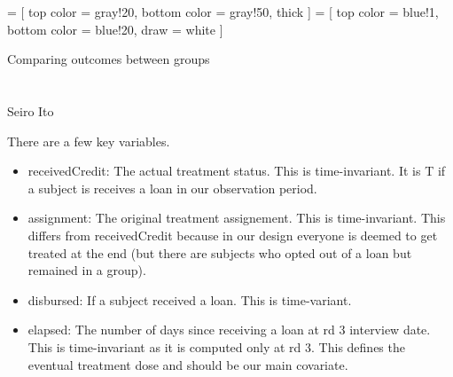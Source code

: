 

\def\pgfsysdriver{pgfsys-dvipdfm.def}
\usepackage{tikz}
\usepackage{fancyhdr}
\usetikzlibrary{calc, arrows, decorations, decorations.pathreplacing, backgrounds}
 =
[
top color = gray!20, bottom color = gray!50, thick
]
 =
[
top color = blue!1, bottom color = blue!20, draw = white
]



\setlength{\baselineskip}{12pt}





\hfil Comparing outcomes between groups\\

\hfil\MonthDY\\
\hfil{\footnotesize\currenttime}\\

\hfil Seiro Ito

\tableofcontents

\setlength{\parindent}{1em}

\vspace{2ex}

There are a few key variables.
\begin{itemize}
\vspace{1.0ex}\setlength{\itemsep}{1.0ex}\setlength{\baselineskip}{12pt}
\item	\textsf{receivedCredit}: The actual treatment status. This is time-invariant. It is T if a subject is receives a loan in our observation period.
\item	\textsf{assignment}: The original treatment assignement. This is time-invariant. This differs from \textsf{receivedCredit} because in our design everyone is deemed to get treated at the end (but there are subjects who opted out of a loan but remained in a group).
\item	\textsf{disbursed}: If a subject received a loan. This is time-variant.
\item	\textsf{elapsed}: The number of days since receiving a loan at rd 3 interview date. This is time-invariant as it is computed only at rd 3. This defines the eventual treatment dose and should be our main covariate.
\end{itemize}

